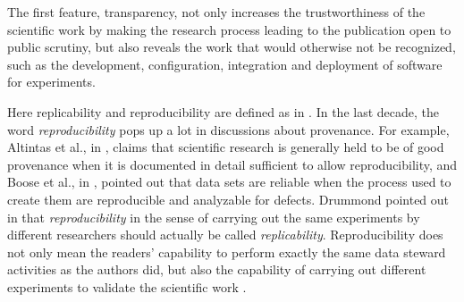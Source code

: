 The first feature, transparency, not only increases the trustworthiness of the scientific work by making the research process leading to the publication open to public scrutiny, but also reveals the work that would otherwise not be recognized, such as the development, configuration, integration and deployment of software for experiments. \cite{goble2014better} 

Here replicability and reproducibility are defined as in \cite{drummond2009replicability}. In the last decade, the word \emph{reproducibility} pops up a lot in discussions about provenance. For example, Altintas et al., in \cite{altintas2004kepler}, claims that scientific research is generally held to be of good provenance when it is documented in detail sufficient to allow reproducibility, and Boose et al., in \cite{boose2007ensuring}, pointed out that data sets are reliable when the process used to create them are reproducible and analyzable for defects. Drummond pointed out in \cite{drummond2009replicability} that \emph{reproducibility} in the sense of carrying out the same experiments by different researchers should actually be called \emph{replicability}. 
Reproducibility does not only mean the readers' capability to perform exactly the same data steward activities as the authors did, but also the capability of carrying out different experiments to validate the scientific work \cite{drummond2009replicability}. 
\cite{goble2014better}



